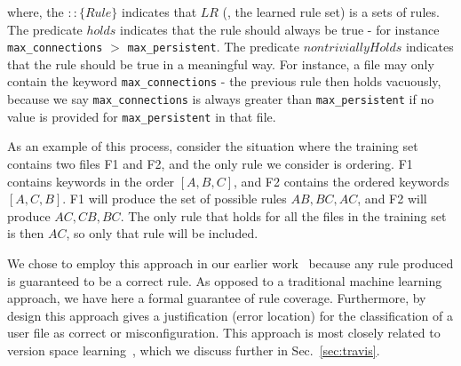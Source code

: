 where, the $:: \{Rule\}$ indicates that $LR$ (\ie, the learned rule set) 
is a sets of rules.
The predicate $holds$ indicates that the rule should always be true -
  for instance {\tt max\_connections} $>$ {\tt max\_persistent}.
The predicate $nontriviallyHolds$ indicates that the rule should be true in a meaningful way.
For instance, a file may only contain the keyword {\tt max\_connections} - the previous rule then holds vacuously,
 because we say {\tt max\_connections} is always greater than {\tt max\_persistent} if no value is provided for {\tt max\_persistent} in that file.


As an example of this process, consider the situation 
where the training set contains two files F1 and F2, 
and the only rule we consider is ordering.
F1 contains keywords in the order $[A,B,C]$, 
and F2 contains the ordered keywords $[A,C,B]$.
F1 will produce the set of possible rules $AB, BC, AC$, 
and F2 will produce $AC, CB, BC$.
The only rule that holds for all the files in the training set is 
then $AC$, so only that rule will be included.

We chose to employ this approach in our earlier work~\cite{santolucitoCAV} because any rule produced is guaranteed to be a correct rule.
As opposed to a traditional machine learning approach, we have here a formal guarantee of rule coverage.
Furthermore, by design this approach gives a justification (error location) for the classification of a user file as correct or misconfiguration.
This approach is most closely related to version space learning~\cite{mitchell77}, which we discuss further in Sec.~\ref{sec:travis}.

